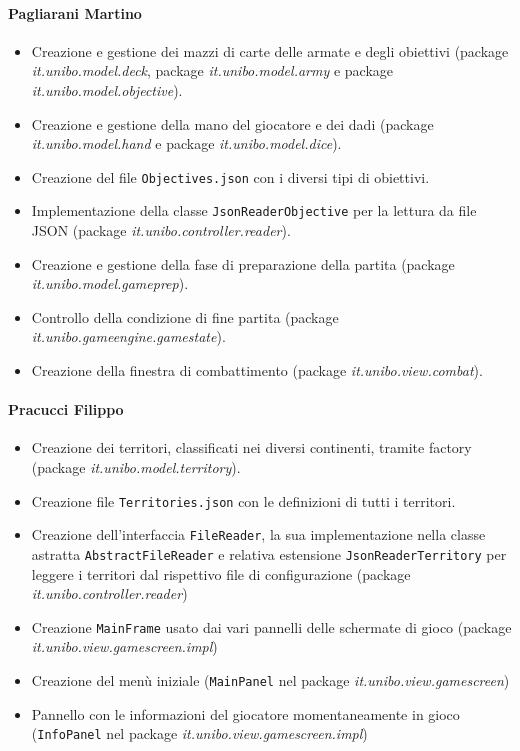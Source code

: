 \documentclass[a4paper,12pt]{report}
\begin{document}
\paragraph{Pagliarani Martino}
%
\begin{itemize}
    \item Creazione e gestione dei mazzi di carte delle armate e degli obiettivi (package \textit{it.unibo.model.deck}, package \textit{it.unibo.model.army} e package \textit{it.unibo.model.objective}).
    \item Creazione e gestione della mano del giocatore e dei dadi (package \textit{it.unibo.model.hand} e package \textit{it.unibo.model.dice}).
    \item Creazione del file \texttt{Objectives.json} con i diversi tipi di obiettivi.
    \item Implementazione della classe \texttt{JsonReaderObjective} per la lettura da file JSON (package \textit{it.unibo.controller.reader}).
    \item Creazione e gestione della fase di preparazione della partita (package \textit{it.unibo.model.gameprep}).
    \item Controllo della condizione di fine partita (package \textit{it.unibo.gameengine.gamestate}).
    \item Creazione della finestra di combattimento (package \textit{it.unibo.view.combat}).
\end{itemize}

\paragraph{Pracucci Filippo}
%
\begin{itemize}
    \item Creazione dei territori, classificati nei diversi continenti, tramite factory (package \textit{it.unibo.model.territory}).
    \item Creazione file \texttt{Territories.json} con le definizioni di tutti i territori.
    \item Creazione dell'interfaccia \texttt{FileReader}, la sua implementazione nella classe astratta \texttt{AbstractFileReader} e relativa estensione \texttt{JsonReaderTerritory} per leggere i territori dal rispettivo file di configurazione (package \textit{it.unibo.controller.reader})
    \item Creazione \texttt{MainFrame} usato dai vari pannelli delle schermate di gioco (package \textit{it.unibo.view.gamescreen.impl})
    \item Creazione del men\`u iniziale (\texttt{MainPanel} nel package \textit{it.unibo.view.gamescreen})
    \item Pannello con le informazioni del giocatore momentaneamente in gioco (\texttt{InfoPanel} nel package \textit{it.unibo.view.gamescreen.impl})
\end{itemize}
\end{document}

